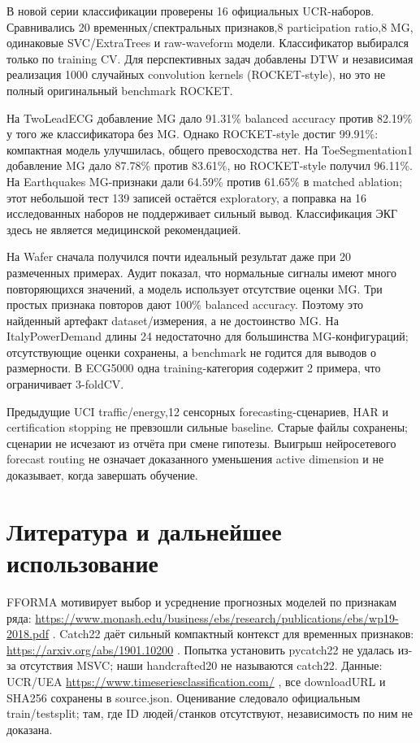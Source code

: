 \documentclass[10pt,a4paper]{article}
\begin{document}
В новой серии классификации проверены 16 официальных UCR-наборов. Сравнивались 20 временных/спектральных признаков,8 participation ratio,8 MG, одинаковые SVC/ExtraTrees и raw-waveform модели. Классификатор выбирался только по training CV. Для перспективных задач добавлены DTW и независимая реализация 1000 случайных convolution kernels (ROCKET-style), но это не полный оригинальный benchmark ROCKET.

На TwoLeadECG добавление MG дало 91.31\% balanced accuracy против 82.19\% у того же классификатора без MG. Однако ROCKET-style достиг 99.91\%: компактная модель улучшилась, общего превосходства нет. На ToeSegmentation1 добавление MG дало 87.78\% против 83.61\%, но ROCKET-style получил 96.11\%. На Earthquakes MG-признаки дали 64.59\% против 61.65\% в matched ablation; этот небольшой тест 139 записей остаётся exploratory, а поправка на 16 исследованных наборов не поддерживает сильный вывод. Классификация ЭКГ здесь не является медицинской рекомендацией.

На Wafer сначала получился почти идеальный результат даже при 20 размеченных примерах. Аудит показал, что нормальные сигналы имеют много повторяющихся значений, а модель использует отсутствие оценки MG. Три простых признака повторов дают 100\% balanced accuracy. Поэтому это найденный артефакт dataset/измерения, а не достоинство MG. На ItalyPowerDemand длины 24 недостаточно для большинства MG-конфигураций; отсутствующие оценки сохранены, а benchmark не годится для выводов о размерности. В ECG5000 одна training-категория содержит 2 примера, что ограничивает 3-foldCV.

Предыдущие UCI traffic/energy,12 сенсорных forecasting-сценариев, HAR и certification stopping не превзошли сильные baseline. Старые файлы сохранены; сценарии не исчезают из отчёта при смене гипотезы. Выигрыш нейросетевого forecast routing не означает доказанного уменьшения active dimension и не доказывает, когда завершать обучение.

\section*{Литература и дальнейшее использование}

FFORMA мотивирует выбор и усреднение прогнозных моделей по признакам ряда: \url{https://www.monash.edu/business/ebs/research/publications/ebs/wp19-2018.pdf} . Catch22 даёт сильный компактный контекст для временных признаков: \url{https://arxiv.org/abs/1901.10200} . Попытка установить pycatch22 не удалась из-за отсутствия MSVC; наши handcrafted20 не называются catch22. Данные: UCR/UEA \url{https://www.timeseriesclassification.com/} , все downloadURL и SHA256 сохранены в source.json. Оценивание следовало официальным train/testsplit; там, где ID людей/станков отсутствуют, независимость по ним не доказана.
\end{document}
